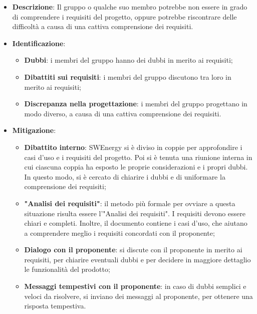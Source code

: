 \label{risk:comprensione dei requisiti carente}
\begin{itemize}
	\item \textbf{Descrizione}:
	      Il gruppo o qualche suo membro potrebbe non essere in grado di
	      comprendere i requisiti del progetto, oppure potrebbe riscontrare
	      delle difficoltà a causa di una cattiva comprensione dei requisiti.
	\item \textbf{Identificazione}:
	      \begin{itemize}
		      \item \textbf{Dubbi}: i membri del gruppo hanno dei dubbi in merito ai
		            requisiti;

		      \item \textbf{Dibattiti sui requisiti}: i membri del gruppo
		            discutono tra loro in merito ai requisiti;

		      \item \textbf{Discrepanza nella progettazione}: i membri del
		            gruppo progettano in modo diverso, a causa di una cattiva
		            comprensione dei requisiti.
	      \end{itemize}

	\item \textbf{Mitigazione}:
	      \begin{itemize}
		      \item \textbf{Dibattito interno}: SWEnergy si è diviso in coppie
		            per approfondire i casi d'uso e i requisiti del progetto.
		            Poi si è tenuta una riunione interna in cui ciascuna coppia
		            ha esposto  le proprie considerazioni e i propri dubbi. In
		            questo modo, si è cercato di chiarire i dubbi e di
		            uniformare la comprensione dei requisiti;

		      \item \textbf{"Analisi dei requisiti"}: il metodo più formale per
		            ovviare a questa situazione risulta essere
		            l'"Analisi dei requisiti".
		            I requisiti devono essere chiari e completi. Inoltre,
		            il documento contiene i casi d'uso, che aiutano a
		            comprendere meglio i requisiti concordati con il proponente;

		      \item \textbf{Dialogo con il proponente}: si discute con il proponente in
		            merito ai requisiti, per chiarire eventuali dubbi e per
		            decidere in maggiore dettaglio le funzionalità del prodotto;

		      \item \textbf{Messaggi tempestivi con il proponente}: in caso di dubbi
		            semplici e veloci da risolvere, si inviano dei messaggi al
		            proponente, per ottenere una risposta tempestiva.
	      \end{itemize}
\end{itemize}

